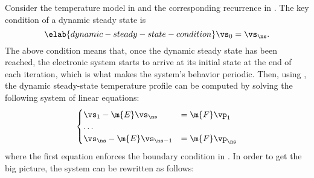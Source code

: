 Consider the temperature model in  and the corresponding
recurrence in . The key condition of a dynamic steady
state is
\begin{equation} \elab{dynamic-steady-state-condition}
  \vs_0 = \vs_\ns.
\end{equation}
The above condition means that, once the dynamic steady state has been reached,
the electronic system starts to arrive at its initial state at the end of each
iteration, which is what makes the system's behavior periodic. Then, using
, the dynamic steady-state temperature profile can be
computed by solving the following system of linear equations:
\[
  \begin{cases}
    \vs_1 - \m{E} \vs_\ns & = \m{F} \vp_1 \\
    \dots \\
    \vs_\ns - \m{E} \vs_{\ns - 1} & = \m{F} \vp_\ns
  \end{cases}
\]
where the first equation enforces the boundary condition in
. In order to get the big picture, the
system can be rewritten as follows:
